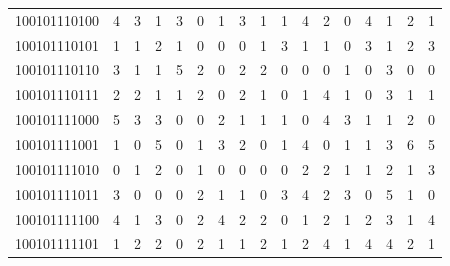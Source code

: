 \documentclass[10pt,a4paper]{article}
\begin{document}
\begin{longtable}{ |c|c|c|c|c|c|c|c|c|c|c|c|c|c|c|c|c| }
    100101110100              & 4                            & 3                                & 1                            & 3                              & 0   & 1   & 3   & 1   & 1   & 4   & 2   & 0   & 4   & 1   & 2   & 1   \\
    100101110101              & 1                            & 1                                & 2                            & 1                              & 0   & 0   & 0   & 1   & 3   & 1   & 1   & 0   & 3   & 1   & 2   & 3   \\
    100101110110              & 3                            & 1                                & 1                            & 5                              & 2   & 0   & 2   & 2   & 0   & 0   & 0   & 1   & 0   & 3   & 0   & 0   \\
    100101110111              & 2                            & 2                                & 1                            & 1                              & 2   & 0   & 2   & 1   & 0   & 1   & 4   & 1   & 0   & 3   & 1   & 1   \\
    100101111000              & 5                            & 3                                & 3                            & 0                              & 0   & 2   & 1   & 1   & 1   & 0   & 4   & 3   & 1   & 1   & 2   & 0   \\
    100101111001              & 1                            & 0                                & 5                            & 0                              & 1   & 3   & 2   & 0   & 1   & 4   & 0   & 1   & 1   & 3   & 6   & 5   \\
    100101111010              & 0                            & 1                                & 2                            & 0                              & 1   & 0   & 0   & 0   & 0   & 2   & 2   & 1   & 1   & 2   & 1   & 3   \\
    100101111011              & 3                            & 0                                & 0                            & 0                              & 2   & 1   & 1   & 0   & 3   & 4   & 2   & 3   & 0   & 5   & 1   & 0   \\
    100101111100              & 4                            & 1                                & 3                            & 0                              & 2   & 4   & 2   & 2   & 0   & 1   & 2   & 1   & 2   & 3   & 1   & 4   \\
    100101111101              & 1                            & 2                                & 2                            & 0                              & 2   & 1   & 1   & 2   & 1   & 2   & 4   & 1   & 4   & 4   & 2   & 1   \\

\end{longtable}
\end{document}
